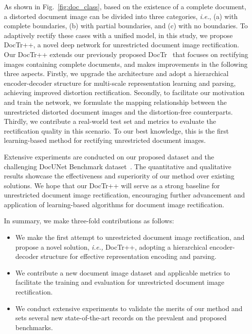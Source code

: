 \documentclass[lettersize,journal]{IEEEtran}
\begin{document}
As shown in Fig.~\ref{fig:doc_class},
based on the existence of a complete document, a distorted document image can be divided into three categories, \emph{i.e.}, 
(a) with complete boundaries, (b) with partial boundaries, and (c) with no boundaries.
To adaptively rectify these cases with a unified model, in this study, we propose DocTr++, a novel deep network for unrestricted document image rectification.
Our DocTr++ extends our previously proposed DocTr~\cite{feng2021doctr} that focuses on rectifying images containing complete documents,
and makes improvements in the following three aspects.
Firstly, 
we upgrade the architecture and adopt a hierarchical encoder-decoder structure for multi-scale representation learning and parsing, achieving improved distortion rectification.
Secondly, to facilitate our motivation and train the network,
we formulate the mapping relationship between the unrestricted distorted document images and the distortion-free counterparts.
Thirdly,
we contribute a real-world test set and metrics to evaluate the rectification quality in this scenario.
To our best knowledge, this is the first learning-based method for rectifying unrestricted document images.

Extensive experiments are conducted on our proposed dataset and the challenging DocUNet Benchmark dataset~\cite{8578592}.
The quantitative and qualitative results showcase the effectiveness and superiority of our method over existing solutions. 
We hope that our DocTr++ will serve as a strong baseline for unrestricted document image rectification,
encouraging further advancement and application of learning-based algorithms for document image rectification.

In summary, we make three-fold contributions as follows:
\begin{itemize} \item
    We make the first attempt to unrestricted document image rectification, and propose a novel solution, \emph{i.e.,} DocTr++, adopting a hierarchical encoder-decoder structure for effective representation encoding and parsing.
    \item
    We contribute a new document image dataset and applicable metrics to facilitate the training and evaluation for unrestricted document image rectification.
    \item
    We conduct extensive experiments to validate the merits of our method and
    sets several new state-of-the-art records on the prevalent and proposed benchmarks.
    
\end{itemize}
\end{document}
